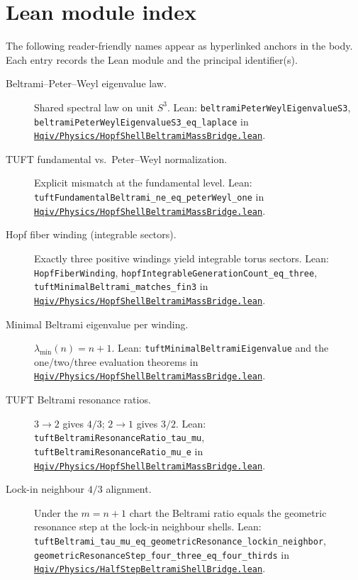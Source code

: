 \documentclass[11pt]{article}
\newcommand{\leanrepo}{https://github.com/HQIV/hqiv-lean/blob/main}
\newcommand{\leanfile}[1]{\href{\leanrepo/#1}{\nolinkurl{#1}}}
\newcommand{\leanid}[1]{\nolinkurl{#1}}
\begin{document}
\appendix
\section{Lean module index}\label{app:lean-index}

The following reader-friendly names appear as hyperlinked anchors in the
body. Each entry records the Lean module and the principal identifier(s).

\begin{description}

\item[\label{lean:beltrami-peter-weyl}Beltrami--Peter--Weyl eigenvalue law.]
  Shared spectral law on unit $S^3$. Lean:
  \leanid{beltramiPeterWeylEigenvalueS3},
  \leanid{beltramiPeterWeylEigenvalueS3\_eq\_laplace}
  in \leanfile{Hqiv/Physics/HopfShellBeltramiMassBridge.lean}.

\item[\label{lean:tuft-fundamental-ne}TUFT fundamental vs.\ Peter--Weyl normalization.]
  Explicit mismatch at the fundamental level. Lean:
  \leanid{tuftFundamentalBeltrami\_ne\_eq\_peterWeyl\_one}
  in \leanfile{Hqiv/Physics/HopfShellBeltramiMassBridge.lean}.

\item[\label{lean:hopf-fiber-winding}Hopf fiber winding (integrable sectors).]
  Exactly three positive windings yield integrable torus sectors.
  Lean: \leanid{HopfFiberWinding},
  \leanid{hopfIntegrableGenerationCount\_eq\_three},
  \leanid{tuftMinimalBeltrami\_matches\_fin3}
  in \leanfile{Hqiv/Physics/HopfShellBeltramiMassBridge.lean}.

\item[\label{lean:tuft-minimal-beltrami}Minimal Beltrami eigenvalue per winding.]
  $\lambda_{\mathrm{min}}(n)=n+1$. Lean:
  \leanid{tuftMinimalBeltramiEigenvalue}
  and the one/two/three evaluation theorems
  in \leanfile{Hqiv/Physics/HopfShellBeltramiMassBridge.lean}.

\item[\label{lean:tuft-beltrami-ratios}TUFT Beltrami resonance ratios.]
  $3\to2$ gives $4/3$; $2\to1$ gives $3/2$. Lean:
  \leanid{tuftBeltramiResonanceRatio\_tau\_mu},
  \leanid{tuftBeltramiResonanceRatio\_mu\_e}
  in \leanfile{Hqiv/Physics/HopfShellBeltramiMassBridge.lean}.

\item[\label{lean:lockin-4-3-match}Lock-in neighbour $4/3$ alignment.]
  Under the $m=n+1$ chart the Beltrami ratio equals the geometric
  resonance step at the lock-in neighbour shells. Lean:
  \leanid{tuftBeltrami\_tau\_mu\_eq\_geometricResonance\_lockin\_neighbor},
  \leanid{geometricResonanceStep\_four\_three\_eq\_four\_thirds}
  in \leanfile{Hqiv/Physics/HalfStepBeltramiShellBridge.lean}.


\end{description}
\end{document}
